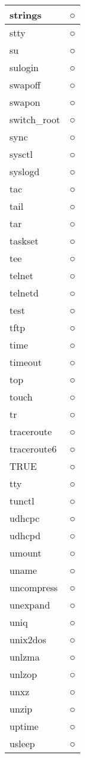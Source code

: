 \begin{longtable}{p{60mm}p{60mm}}
strings & ○ \\ \hline
stty & ○ \\ \hline
su & ○ \\ \hline
sulogin & ○ \\ \hline
swapoff & ○ \\ \hline
swapon & ○ \\ \hline
switch_root & ○ \\ \hline
sync & ○ \\ \hline
sysctl & ○ \\ \hline
syslogd & ○ \\ \hline
tac & ○ \\ \hline
tail & ○ \\ \hline
tar & ○ \\ \hline
taskset & ○ \\ \hline
tee & ○ \\ \hline
telnet & ○ \\ \hline
telnetd & ○ \\ \hline
test & ○ \\ \hline
tftp & ○ \\ \hline
time & ○ \\ \hline
timeout & ○ \\ \hline
top & ○ \\ \hline
touch & ○ \\ \hline
tr & ○ \\ \hline
traceroute & ○ \\ \hline
traceroute6 & ○ \\ \hline
TRUE & ○ \\ \hline
tty & ○ \\ \hline
tunctl & ○ \\ \hline
udhcpc & ○ \\ \hline
udhcpd & ○ \\ \hline
umount & ○ \\ \hline
uname & ○ \\ \hline
uncompress & ○ \\ \hline
unexpand & ○ \\ \hline
uniq & ○ \\ \hline
unix2dos & ○ \\ \hline
unlzma & ○ \\ \hline
unlzop & ○ \\ \hline
unxz & ○ \\ \hline
unzip & ○ \\ \hline
uptime & ○ \\ \hline
usleep & ○ \\ \hline

\end{longtable}
